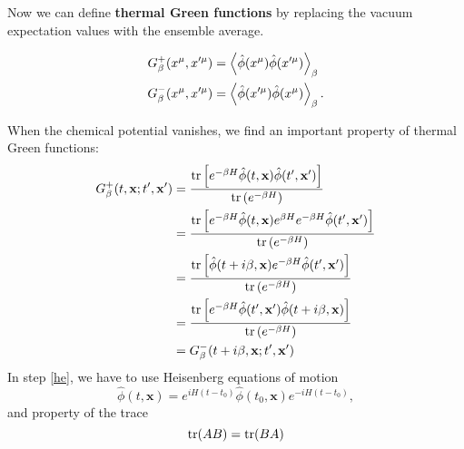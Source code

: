 \documentclass[12pt]{article}
\numberwithin{equation}{subsection}
\theoremstyle{mystyle}{\newtheorem{definition}{Definition}[subsection]}
\theoremstyle{mystyle}{\newtheorem{theorem}[definition]{Theorem}}
\theoremstyle{mystyle}{\newtheorem*{remark}{Remark}}
\theoremstyle{mystyle}{\newtheorem{example}{Example}[subsection]}
\theoremstyle{mystyle}{\newtheorem{examples}{Examples}[subsection]}
\theoremstyle{mystyle}{\newtheorem{cthm}{}[subsection]}
\newcommand{\tbf}[1]{\textbf{#1}}
\begin{document}
Now we can define \tbf{thermal Green functions} by replacing the vacuum expectation values with the ensemble average.

\begin{example}
  \begin{align*}
    G^{+}_{\beta}(x^{\mu},x'^{\mu}) & =\expval{\hat{\phi}(x^{\mu})\hat{\phi}(x'^{\mu})}_{\beta}  \\
    G^{-}_{\beta}(x^{\mu},x'^{\mu}) & =\expval{\hat{\phi}(x'^{\mu})\hat{\phi}(x^{\mu})}_{\beta}.
  \end{align*}
\end{example}

When the chemical potential vanishes, we find an important property of thermal Green functions:
\begin{align}
  G^{+}_{\beta}(t,\mathbf{x};t',\mathbf{x'}) & =\frac{\tr\left[e^{-\beta H}\hat{\phi}(t,\mathbf{x})\hat{\phi}(t',\mathbf{x'})\right]}
  {\tr\left(e^{-\beta H}\right)}                                                                                                                             \\
                                             & =\frac{\tr\left[e^{-\beta H}\hat{\phi}(t,\mathbf{x})e^{\beta H}e^{-\beta H}\hat{\phi}(t',\mathbf{x'})\right]}
  {\tr\left(e^{-\beta H}\right)}                                                                                                                             \\
                                             & =\frac{\tr\left[\hat{\phi}(t+i\beta,\mathbf{x})e^{-\beta H}\hat{\phi}(t',\mathbf{x'})\right]}
  {\tr\left(e^{-\beta H}\right)}\label{he}                                                                                                                   \\
                                             & =\frac{\tr\left[e^{-\beta H}\hat{\phi}(t',\mathbf{x'})\hat{\phi}(t+i\beta,\mathbf{x})\right]}
  {\tr\left(e^{-\beta H}\right)}                                                                                                                             \\
                                             & =G^{-}_{\beta}(t+i\beta,\mathbf{x};t',\mathbf{x'})
\end{align}
In step \ref{he}, we have to use Heisenberg equations of motion
\begin{equation}
  \hat{\phi}(t,\mathbf{x})=e^{iH(t-t_0)}\hat{\phi}(t_0,\mathbf{x})e^{-i H(t-t_0)},
\end{equation}
and property of the trace
\begin{equation}
  \tr(AB)=\tr(BA)
\end{equation}
\end{document}
